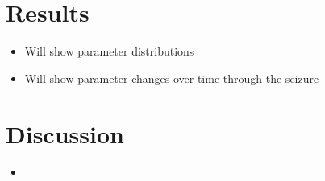 \documentclass[]{article}
\begin{document}
\section{Results}
\begin{itemize}
	\item Will show parameter distributions
	\item Will show parameter changes over time through the seizure
\end{itemize}

\section{Discussion}
\begin{itemize}
	\item  
\end{itemize}



\end{document}
